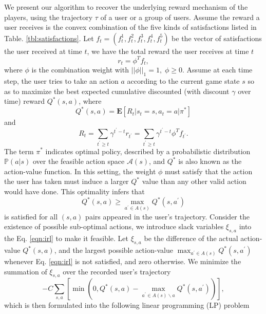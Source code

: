 \documentclass{sigchi}
\begin{document}
We present our algorithm to recover the underlying reward mechanism of the players, using the trajectory $\tau$ of a user or a group of users.
Assume the reward a user receives is the convex combination of the five kinds of satisfactions listed in Table. \ref{tbl:satisfactions}.
Let $f_t=(f_t^1,f_t^2,f_t^3,f_t^4,f_t^5)$ be the vector of satisfactions the user received at time $t$, we have the total reward the user receives at time $t$
\begin{equation*}
r_t=\phi^Tf_t,
\end{equation*}
where $\phi$ is the combination weight with $||\phi||_1=1, \; \phi \geq 0$.
Assume at each time step, the user tries to take an action $a$ according to the current game state $s$ so as to maximize the best expected cumulative discounted (with discount $\gamma$ over time) reward $Q^\ast(s, a)$, where
$$Q^\ast(s,a)=\mathbf{E}[R_t | s_{t}=s, a_{t}=a | \pi^\ast]$$
and
$$R_t=\sum_{t^\prime\geq t}\gamma^{t^\prime-t}r_{t^\prime}=\sum_{t^\prime\geq t}\gamma^{t^\prime-t}\phi^Tf_{t^\prime}.$$
The term $\pi^\ast$ indicates optimal policy, described by a probabilistic distribution $\mathbb{P}(a|s)$ over the feasible action space $\mathcal{A}(s)$, and $Q^\ast$ is also known as the action-value function.
In this setting, the weight $\phi$ must satisfy that the action the user has taken must induce a larger $Q^\ast$ value than any other valid action would have done.
This optimality infers that
\begin{equation}
Q^\ast(s,a) \geq \max_{a^\prime \in A(s)}Q^\ast(s,a^\prime)
\label{eqn:irl}
\end{equation}
is satisfied for all $(s,a)$ pairs appeared in the user's trajectory.
Consider the existence of possible sub-optimal actions, we introduce slack variables $\xi_{s,a}$ into the Eq. \eqref{eqn:irl} to make it feasible.
Let $\xi_{s,a}$ be the difference of the actual action-value $Q^\ast(s,a)$, and the largest possible action-value $\max_{a^\prime \in A(s)}Q^\ast(s,a^\prime)$ whenever Eq. \eqref{eqn:irl} is not satisfied, and zero otherwise.
We minimize the summation of $\xi_{s,a}$ over the recorded user's trajectory
\begin{equation}
-C\sum_{s,a} \left[\min(0, Q^\ast(s,a) - \max_{a^\prime \in A(s)\backslash a}Q^\ast(s,a^\prime))\right], \label{eqn:slack}
\end{equation}
which is then formulated into the following linear programming (LP) problem
\end{document}
